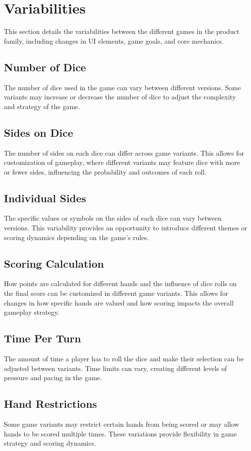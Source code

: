 \section{Variabilities}

This section details the variabilities between the different games in the product family, including changes in UI elements, game goals, and core mechanics.

\subsection{Number of Dice}
The number of dice used in the game can vary between different versions. Some variants may increase or decrease the number of dice to adjust the complexity and strategy of the game.

\subsection{Sides on Dice}
The number of sides on each dice can differ across game variants. This allows for customization of gameplay, where different variants may feature dice with more or fewer sides, influencing the probability and outcomes of each roll.

\subsection{Individual Sides}
The specific values or symbols on the sides of each dice can vary between versions. This variability provides an opportunity to introduce different themes or scoring dynamics depending on the game's rules.

\subsection{Scoring Calculation}
How points are calculated for different hands and the influence of dice rolls on the final score can be customized in different game variants. This allows for changes in how specific hands are valued and how scoring impacts the overall gameplay strategy.

\subsection{Time Per Turn}
The amount of time a player has to roll the dice and make their selection can be adjusted between variants. Time limits can vary, creating different levels of pressure and pacing in the game.

\subsection{Hand Restrictions}
Some game variants may restrict certain hands from being scored or may allow hands to be scored multiple times. These variations provide flexibility in game strategy and scoring dynamics.
